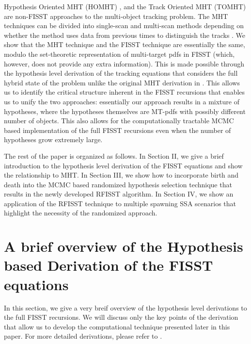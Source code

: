 \documentclass[10pt, conference]{IEEEtran}
\begin{document}
Hypothesis Oriented MHT (HOMHT) \cite{HOMHT, BarShalom1, BarShalom2, mcmcda}, and the Track Oriented MHT (TOMHT) \cite{TOMHT} are non-FISST approaches to the multi-object tracking problem. The MHT techniques can be divided into single-scan and multi-scan methods depending on whether the method uses data from previous times to distinguish the tracks \cite{BarShalom1, jpda, mcmcda}. We show that  the MHT technique and the FISST technique are essentially the same, modulo the set-theoretic representation of multi-target pdfs in FISST (which, however, does not provide any extra information). This is made possible through the hypothesis level derivation of the tracking equations that considers the full hybrid state of the problem unlike the original MHT derivation in \cite{HOMHT}. This allows us to identify the critical structure inherent in the FISST recursions that enables us to unify the two approaches: essentially our approach results in a mixture of hypotheses, where the hypotheses themselves are MT-pdfs with possibly different number of objects. This also allows for the computationally tractable MCMC based implementation of the full FISST recursions even when the number of hypotheses grow extremely large.

The rest of the paper is organized as follows. In Section II, we give a brief introduction to the hypothesis level derivation of the FISST equations and show the relationship to MHT. In Section III, we show how to incorporate birth and death into the MCMC based randomized hypothesis selection technique that results in the newly developed RFISST algorithm. In Section IV, we show an application of the RFISST technique to multiple spawning SSA scenarios that highlight the necessity of the randomized approach.    


\section{A brief overview of the Hypothesis based Derivation of the FISST equations}
In this section, we give a very breif overview of the hypothesis level derivations to the full FISST recursions. We will discuss only the key points of the derivation that allow us to develop the computational technique presented later in this paper. For more detailed derivations, please refer to \cite{Faber1,Faber2}.
\end{document}
